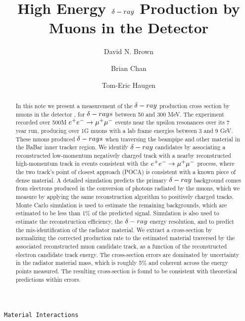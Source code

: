 \documentclass[review]{elsarticle}
\def\deltaray{\ensuremath{{\rm \delta}-ray}\xspace}
\def\deltarays{\ensuremath{{\rm \delta}-rays}\xspace}
\def\eetomm{\ensuremath{ \epem \to \mumu}\xspace}
\begin{document}
\begin{frontmatter}

\title{High Energy \deltaray Production by Muons in the \lbabar \xspace Detector}

\author[LBLaddress]{David N. Brown}
\author[LBLaddress]{Brian Chan}
\author[LBLaddress]{Tom-Eric Haugen}
\address[LBLaddress]{Lawrence Berkeley National Lab}

\begin{abstract}
In this note we present a measurement of the \deltaray production cross section
by muons in the \babar detector \cite{babarnim}, for \deltarays between 50 and 300 MeV.
The \babar experiment
recorded over 500M \eetomm events near the upsilon resonances over its 7 year
run, producing over 1G muons with a lab frame energies between 3 and 9 GeV.
These muons produced \deltarays
when traversing the beampipe and other material in the BaBar inner tracker
region.  We identify
\deltaray candidates by associating a reconstructed low-momentum negatively
charged track with a nearby reconstructed high-momentum track in events
consistent with the \eetomm process, where
the two track’s point of closest approach (POCA) is consistent with a known
piece of dense material.  A detailed simulation predicts the primary \deltaray
background comes from electrons produced in the
conversion of photons radiated by the muons, which we measure by applying the
same reconstruction algorithm to positively charged tracks.  Monte Carlo
simulation is used to estimate the remaining backgrounds,
which are estimated to be less than 1\% of the predicted signal.  Simulation is
also used to estimate the reconstruction efficiency, the \deltaray energy
resolution, and to predict the mis-identification of the radiator material.  We
extract a cross-section by normalizing the corrected production rate to the
estimated material traversed by the associated reconstructed muon candidate
track, as a function of the reconstructed electron candidate track energy.  The
cross-section errors are dominated by uncertainty in the radiator material
mass, which is roughly 5\% and coherent across the energy points measured.  The
resulting cross-section is found to be consistent with theoretical predictions
within errors.

\end{abstract}

\begin{keyword}
\texttt{Material Interactions}
\end{keyword}

\end{frontmatter}
\end{document}
